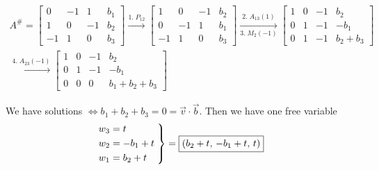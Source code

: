 \documentclass[../main.tex]{subfiles}
\begin{document}
\begin{example}[]
    \begin{gather*}
        A^\# = 
        \begin{bmatrix}
            0 & -1 & 1 & b_1 \\
            1 & 0 & -1 & b_2 \\
            -1 & 1 & 0 & b_3
        \end{bmatrix}
        \xrightarrow{1. \; P_{12}}
        \begin{bmatrix}
            1 & 0 & -1 & b_2 \\
            0 & -1 & 1 & b_1 \\
            -1 & 1 & 0 & b_3
        \end{bmatrix}
        \xrightarrow[3. \; M_2(-1)]{2. \; A_{13}(1)}
        \begin{bmatrix}
            1 & 0 & -1 & b_2 \\
            0 & 1 & -1 & -b_1 \\
            0 & 1 & -1 & b_2+b_3
        \end{bmatrix} \\
        \xrightarrow{4. \; A_{23}(-1)}
        \begin{bmatrix}
            1 & 0 & -1 & b_2 \\
            0 & 1 & -1 & -b_1 \\
            0 & 0 & 0 & b_1 + b_2 + b_3
        \end{bmatrix}
    \end{gather*}
    
    We have solutions \( \iff b_1 + b_2 + b_3 = 0 = \vec{v} \cdot \vec{b} \).
    Then we have one free variable
    \[ \left.\kern-\nulldelimiterspace
        \begin{aligned}
            w_3 &= t \\
            w_2 & = -b_1 + t \\
            w_1 &= b_2 + t
        \end{aligned} \;
    \right\} = \boxed{\left( b_2 + t, \, -b_1+t, \, t \right)}
    \]
\end{example}
\end{document}
